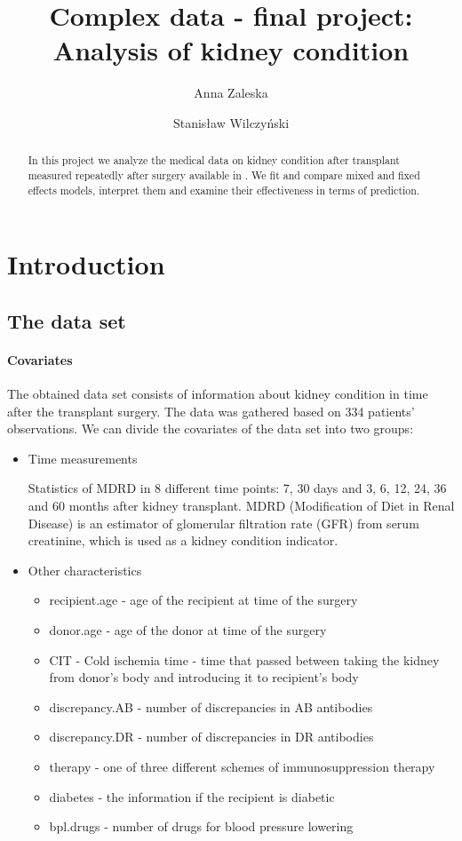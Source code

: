 \documentclass[num-refs]{wiley-article}
\title{Complex data - final project: \\Analysis of kidney condition}
\author[1]{Anna Zaleska}
\author[1]{Stanisław Wilczyński}
\affil[1]{Univeristy of Wrocław}
\begin{document}
\maketitle


\begin{abstract}
In this project we analyze the medical data on kidney condition after transplant measured repeatedly after surgery available in \cite{PBImisc}. We fit and compare mixed and fixed effects models, interpret them and examine their effectiveness in terms of prediction.  

\end{abstract}

\tableofcontents

\section{Introduction}

\subsection{The data set}

\paragraph{Covariates}
The obtained data set consists of information about kidney condition in time after the transplant surgery. The data was gathered based on 334 patients' observations.  We can divide the covariates of the data set into two groups:
\begin{itemize}
\item Time measurements 

Statistics of MDRD in 8 different time points: 7, 30 days and 3, 6, 12, 24, 36 and 60 months after kidney transplant. MDRD (Modification of Diet in Renal Disease) is an estimator of glomerular filtration rate (GFR) from serum creatinine, which is used as a kidney condition indicator.  

\item Other characteristics
\begin{itemize}
\item recipient.age - age of the recipient at time of the surgery
\item donor.age - age of the donor at time of the surgery
\item CIT - Cold ischemia time - time that passed between taking the kidney from donor's body and introducing it to recipient's body
\item discrepancy.AB - number of discrepancies in AB antibodies
\item discrepancy.DR - number of discrepancies in DR antibodies
\item therapy - one of three different schemes of immunosuppression therapy
\item diabetes - the information if the recipient is diabetic
\item bpl.drugs -  number of drugs for blood pressure lowering
\end{itemize}
\end{itemize}
\end{document}
